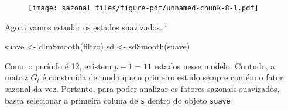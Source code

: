 \documentclass[
  letterpaper,
  DIV=11,
  numbers=noendperiod]{scrreprt}
\newenvironment{Shaded}{\begin{snugshade}}{\end{snugshade}}
\newcommand{\AttributeTok}[1]{\textcolor[rgb]{0.40,0.45,0.13}{#1}}
\newcommand{\CommentTok}[1]{\textcolor[rgb]{0.37,0.37,0.37}{#1}}
\newcommand{\DecValTok}[1]{\textcolor[rgb]{0.68,0.00,0.00}{#1}}
\newcommand{\FloatTok}[1]{\textcolor[rgb]{0.68,0.00,0.00}{#1}}
\newcommand{\FunctionTok}[1]{\textcolor[rgb]{0.28,0.35,0.67}{#1}}
\newcommand{\NormalTok}[1]{\textcolor[rgb]{0.00,0.23,0.31}{#1}}
\newcommand{\OtherTok}[1]{\textcolor[rgb]{0.00,0.23,0.31}{#1}}
\newcommand{\SpecialCharTok}[1]{\textcolor[rgb]{0.37,0.37,0.37}{#1}}
\newcommand{\StringTok}[1]{\textcolor[rgb]{0.13,0.47,0.30}{#1}}
\begin{document}
\begin{figure}[H]

{\centering \texttt{[image: sazonal\_files/figure-pdf/unnamed-chunk-8-1.pdf]}

}

\end{figure}

Agora vamos estudar os estados suavizados. `

\begin{Shaded}
\begin{Highlighting}[]
\NormalTok{suave }\OtherTok{\textless{}{-}} \FunctionTok{dlmSmooth}\NormalTok{(filtro)}
\NormalTok{sd }\OtherTok{\textless{}{-}} \FunctionTok{sdSmooth}\NormalTok{(suave)}
\end{Highlighting}
\end{Shaded}

Como o período é 12, existem \(p-1=11\) estados nesse modelo. Contudo, a
matriz \(G_t\) é construída de modo que o primeiro estado sempre contém
o fator sazonal da vez. Portanto, para poder analizar os fatores
sazonais suavizados, basta selecionar a primeira coluna de \texttt{s}
dentro do objeto \texttt{suave}

\begin{Shaded}
\end{Shaded}
\end{document}
